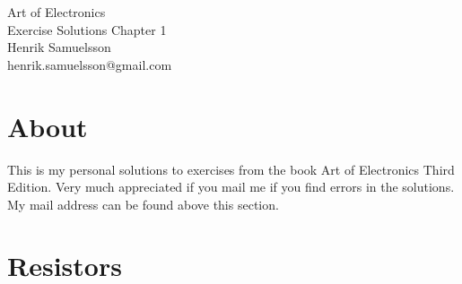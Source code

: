 \documentclass[]{article}
\begin{document}
\begingroup  
	\raggedright
	\LARGE Art of Electronics\\
	\LARGE Exercise Solutions Chapter 1\\
	\vspace{3mm} %
	\normalsize Henrik Samuelsson\\
	\normalsize henrik.samuelsson@gmail.com
\endgroup
	
\section*{About}
	This is my personal solutions to exercises from the book Art of Electronics Third Edition. Very much appreciated if you mail me if you find errors in the solutions. My mail address can be found above this section.

\section*{Resistors}
\end{document}
